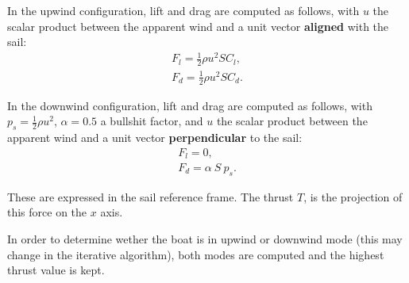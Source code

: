     In the upwind configuration, lift and drag are computed as follows, with $u$ the scalar product between the apparent wind and a unit vector \textbf{aligned} with the sail:
    \begin{eqnarray}
        F_l = \frac{1}{2}\rho u^2 S C_l, \\ 
        F_d = \frac{1}{2}\rho u^2 S C_d.
        \label{eqn:windforce_upwind}
    \end{eqnarray}

    In the downwind configuration, lift and drag are computed as follows, with $p_s=\frac{1}{2}\rho u^2$, $\alpha=0.5$ a bullshit factor, and $u$ the scalar product between the apparent wind and a unit vector \textbf{perpendicular} to the sail:
    \begin{eqnarray}
        F_l = 0, \\ 
        F_d = \alpha \ S \ p_s.
        \label{eqn:windforce_downwind}
    \end{eqnarray}

    These are expressed in the sail reference frame. The thrust $T$, is the projection of this force on the $x$ axis. 

    In order to determine wether the boat is in upwind or downwind mode (this may change in the iterative algorithm), both modes are computed and the highest thrust value is kept.  

